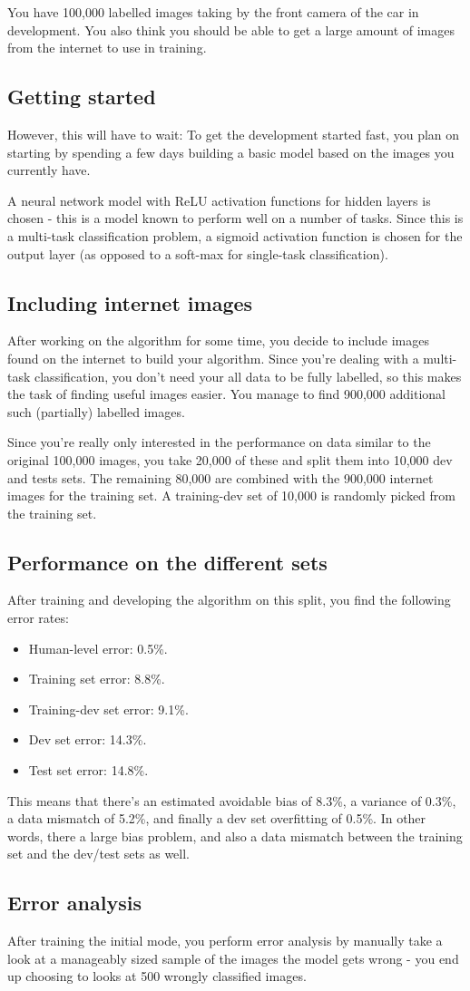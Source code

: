 \documentclass[12pt, a4paper]{article}
\numberwithin{equation}{section}
\begin{document}
You have 100,000 labelled images taking by the front camera of the car in development. You also think you should be able to get a large amount of images from the internet to use in training. 

\subsection{Getting started}
However, this will have to wait: To get the development started fast, you plan on starting by spending a few days building a basic model based on the images you currently have.

A neural network model with ReLU activation functions for hidden layers is chosen - this is a model known to perform well on a number of tasks. Since this is a multi-task classification problem, a sigmoid activation function is chosen for the output layer (as opposed to a soft-max for single-task classification).

\subsection{Including internet images}
After working on the algorithm for some time, you decide to include images found on the internet to build your algorithm. Since you're dealing with a multi-task classification, you don't need your all data to be fully labelled, so this makes the task of finding useful images easier. You manage to find 900,000 additional such (partially) labelled images.

Since you're really only interested in the performance on data similar to the original 100,000 images, you take 20,000 of these and split them into 10,000 dev and tests sets. The remaining 80,000 are combined with the 900,000 internet images for the training set. A training-dev set of 10,000 is randomly picked from the training set.

\subsection{Performance on the different sets}
After training and developing the algorithm on this split, you find the following error rates:
\begin{itemize}
\item Human-level error: 0.5\%.
\item Training set error: 8.8\%.
\item Training-dev set error: 9.1\%.
\item Dev set error: 14.3\%.
\item Test set error: 14.8\%.
\end{itemize}
This means that there's an estimated avoidable bias of 8.3\%, a variance of 0.3\%, a data mismatch of 5.2\%, and finally a dev set overfitting of 0.5\%. In other words, there a large bias problem, and also a  data mismatch between the training set and the dev/test sets as well.

\subsection{Error analysis}
After training the initial mode, you perform error analysis by manually take a look at a manageably sized sample of the images the model gets wrong - you end up choosing to looks at 500 wrongly classified images.
\end{document}
